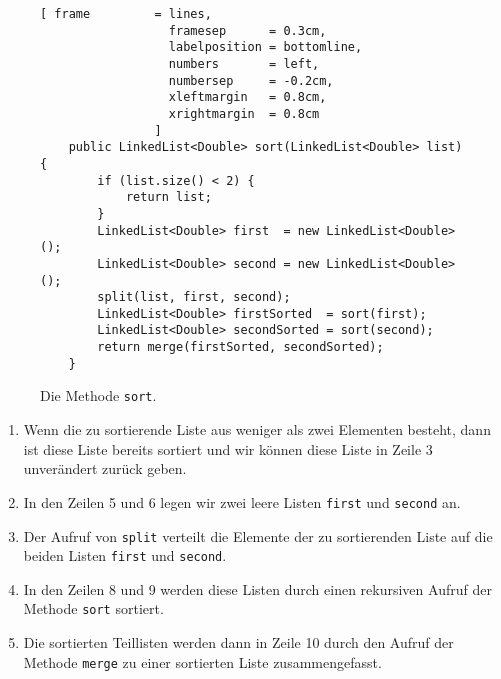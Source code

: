 \begin{figure}[!ht]
  \centering
\begin{Verbatim}[ frame         = lines, 
                  framesep      = 0.3cm, 
                  labelposition = bottomline,
                  numbers       = left,
                  numbersep     = -0.2cm,
                  xleftmargin   = 0.8cm,
                  xrightmargin  = 0.8cm
                ]
    public LinkedList<Double> sort(LinkedList<Double> list) {
        if (list.size() < 2) {
            return list;
        }
        LinkedList<Double> first  = new LinkedList<Double>();
        LinkedList<Double> second = new LinkedList<Double>();
        split(list, first, second);
        LinkedList<Double> firstSorted  = sort(first);
        LinkedList<Double> secondSorted = sort(second);
        return merge(firstSorted, secondSorted);
    }
\end{Verbatim}
\vspace*{-0.3cm}
  \caption{Die Methode \texttt{sort}.}
  \label{fig:merge-sort}
\end{figure}
\begin{enumerate}
\item Wenn die zu sortierende Liste aus weniger als zwei Elementen besteht,
      dann ist diese Liste bereits sortiert und wir k\"onnen diese Liste in Zeile 3
      unver\"andert zur\"uck geben.
\item In den Zeilen 5 und 6 legen wir zwei leere Listen \texttt{first} und \texttt{second}
      an.
\item Der Aufruf von \texttt{split} verteilt die Elemente der zu sortierenden Liste
      auf die beiden Listen \texttt{first} und \texttt{second}.
\item In den Zeilen 8 und 9 werden diese Listen durch einen rekursiven Aufruf der Methode
      \texttt{sort} sortiert.
\item Die sortierten Teillisten werden dann in Zeile 10 durch den Aufruf der Methode
      \texttt{merge} zu einer sortierten Liste zusammengefasst.
\end{enumerate}

